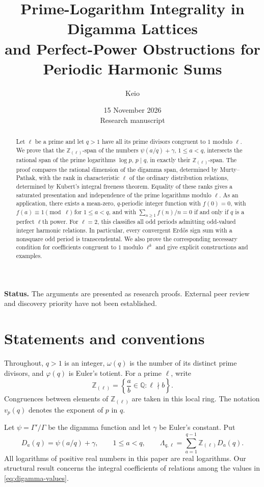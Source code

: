 \documentclass[11pt,a4paper]{article}
\title{Prime-Logarithm Integrality in Digamma Lattices\\
and Perfect-Power Obstructions for Periodic Harmonic Sums}
\author{Keio}
\date{15 November 2026\\\small Research manuscript}
\theoremstyle{definition}
\theoremstyle{remark}
\newcommand{\Q}{\mathbb Q}
\newcommand{\Z}{\mathbb Z}
\newcommand{\Zloc}{\Z_{(\ell)}}
\begin{document}
\maketitle

\begin{abstract}
Let $\ell$ be a prime and let $q>1$ have all its prime divisors congruent
to $1$ modulo $\ell$. We prove that the $\Z_{(\ell)}$-span of the numbers
$\psi(a/q)+\gamma$, $1\le a<q$, intersects the rational span of the prime
logarithms $\log p$, $p\mid q$, in exactly their $\Z_{(\ell)}$-span.
The proof compares the rational dimension of the digamma span, determined
by Murty--Pathak, with the rank in characteristic $\ell$ of the ordinary
distribution relations, determined by Kubert's integral freeness theorem.
Equality of these ranks gives a saturated presentation and independence
of the prime logarithms modulo $\ell$. As an application, there exists a
mean-zero, $q$-periodic integer function with $f(0)=0$, with
$f(a)\equiv1\pmod\ell$ for $1\le a<q$, and with
$\sum_{n\ge1}f(n)/n=0$ if and only if $q$ is a perfect $\ell$th power.
For $\ell=2$, this classifies all odd periods admitting odd-valued
integer harmonic relations. In particular, every convergent Erd\H{o}s
sign sum with a nonsquare odd period is transcendental. We also prove
the corresponding necessary condition for coefficients congruent to
$1$ modulo $\ell^k$ and give explicit constructions and examples.
\end{abstract}

\noindent\textbf{Status.} The arguments are presented as research proofs.
External peer review and discovery priority have not been established.

\section{Statements and conventions}

Throughout, $q>1$ is an integer, $\omega(q)$ is the number of its distinct
prime divisors, and $\varphi(q)$ is Euler's totient. For a prime $\ell$,
write
\[
 \Zloc=\left\{\frac ab\in\Q:\ell\nmid b\right\}.
\]
Congruences between elements of $\Zloc$ are taken in this local ring.
The notation $v_p(q)$ denotes the exponent of $p$ in $q$.

Let $\psi=\Gamma'/\Gamma$ be the digamma function and let $\gamma$ be
Euler's constant. Put
\begin{equation}\label{eq:digamma-values}
 D_a(q)=\psi(a/q)+\gamma,\qquad 1\le a<q,
 \qquad
 \Lambda_{q,\ell}
 =\sum_{a=1}^{q-1}\Zloc D_a(q).
\end{equation}
All logarithms of positive real numbers in this paper are real
logarithms. Our structural result concerns the integral coefficients of
relations among the values in \eqref{eq:digamma-values}.
\end{document}
